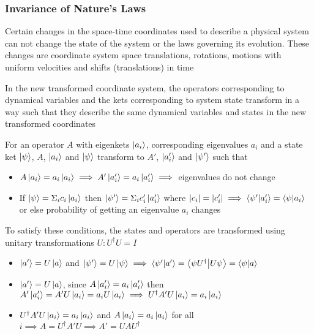 \documentclass[8pt,t,mathserif,aspectratio=169]{beamer}
\begin{document}
\begin{frame}
  \frametitle{Invariance of Nature's Laws}
  \vspace{1mm}
  Certain changes in the space-time coordinates used to describe a physical system can not change the state of the system or the laws governing its evolution. These changes are coordinate system space translations, rotations, motions with uniform velocities and shifts (translations) in time

  In the new transformed coordinate system, the operators corresponding to dynamical variables and the kets corresponding to system state transform in a way such that they describe the same dynamical variables and states in the new transformed coordinates

  For an operator $A$ with eigenkets $\ket{a_i}$, corresponding eigenvalues $a_i$ and a state ket $\ket{\psi}$, $A$, $\ket{a_i}$ and $\ket{\psi}$ transform to $A'$, $\ket{a_i'}$ and $\ket{\psi'}$ such that
  \begin{itemize}
    \item $A \ket{a_i} = a_i \ket{a_i} \implies A' \ket{a_i'} = a_i \ket{a_i'} \implies$ eigenvalues do not change
    \item If $\ket{\psi} = \Sigma_i c_i \ket{a_i}$ then $\ket{\psi'} = \Sigma_i c_i' \ket{a_i'}$ where $|c_i| = |c_i'| \implies \braket{\psi'}{a_i'} = \braket{\psi}{a_i}$ or else probability of getting an eigenvalue $a_i$ changes 
  \end{itemize}
  To satisfy these conditions, the states and operators are transformed using unitary transformations $U: U^{\dagger} U = I$
  \begin{itemize}
    \item $\ket{a'} = U \ket{a}$ and $\ket{\psi'} = U \ket{\psi} \implies \braket{\psi'}{a'} = \bra{\psi U^{\dagger}}\ket{U \psi} = \braket{\psi}{a}$
    \item $\ket{a'} = U \ket{a}$, since $A \ket{a_i'} = a_i \ket{a_i'}$ then $A' \ket{a_i'} = A' U \ket{a_i} = a_i U \ket{a_i} \implies U^{\dagger} A' U \ket{a_i} = a_i \ket{a_i}$
    \item $U^{\dagger} A' U \ket{a_i} = a_i \ket{a_i}$ and $A \ket{a_i} = a_i \ket{a_i}$ for all $i \implies A = U^{\dagger} A' U \implies A' = U A U^{\dagger}$ 
  \end{itemize}
\end{frame}
\end{document}
